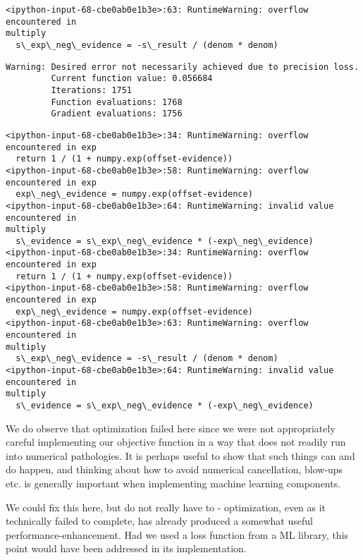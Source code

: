 \documentclass[11pt]{article}
\begin{document}
    \begin{Verbatim}[commandchars=\\\{\}]
<ipython-input-68-cbe0ab0e1b3e>:63: RuntimeWarning: overflow encountered in
multiply
  s\_exp\_neg\_evidence = -s\_result / (denom * denom)
    \end{Verbatim}

    \begin{Verbatim}[commandchars=\\\{\}]
Warning: Desired error not necessarily achieved due to precision loss.
         Current function value: 0.056684
         Iterations: 1751
         Function evaluations: 1768
         Gradient evaluations: 1756
    \end{Verbatim}

    \begin{Verbatim}[commandchars=\\\{\}]
<ipython-input-68-cbe0ab0e1b3e>:34: RuntimeWarning: overflow encountered in exp
  return 1 / (1 + numpy.exp(offset-evidence))
<ipython-input-68-cbe0ab0e1b3e>:58: RuntimeWarning: overflow encountered in exp
  exp\_neg\_evidence = numpy.exp(offset-evidence)
<ipython-input-68-cbe0ab0e1b3e>:64: RuntimeWarning: invalid value encountered in
multiply
  s\_evidence = s\_exp\_neg\_evidence * (-exp\_neg\_evidence)
<ipython-input-68-cbe0ab0e1b3e>:34: RuntimeWarning: overflow encountered in exp
  return 1 / (1 + numpy.exp(offset-evidence))
<ipython-input-68-cbe0ab0e1b3e>:58: RuntimeWarning: overflow encountered in exp
  exp\_neg\_evidence = numpy.exp(offset-evidence)
<ipython-input-68-cbe0ab0e1b3e>:63: RuntimeWarning: overflow encountered in
multiply
  s\_exp\_neg\_evidence = -s\_result / (denom * denom)
<ipython-input-68-cbe0ab0e1b3e>:64: RuntimeWarning: invalid value encountered in
multiply
  s\_evidence = s\_exp\_neg\_evidence * (-exp\_neg\_evidence)
    \end{Verbatim}

    We do observe that optimization failed here since we were not
appropriately careful implementing our objective function in a way that
does not readily run into numerical pathologies. It is perhaps useful to
show that such things can and do happen, and thinking about how to avoid
numerical cancellation, blow-ups etc. is generally important when
implementing machine learning components.

We could fix this here, but do not really have to - optimization, even
as it technically failed to complete, has already produced a somewhat
useful performance-enhancement. Had we used a loss function from a ML
library, this point would have been addressed in its implementation.
\end{document}
